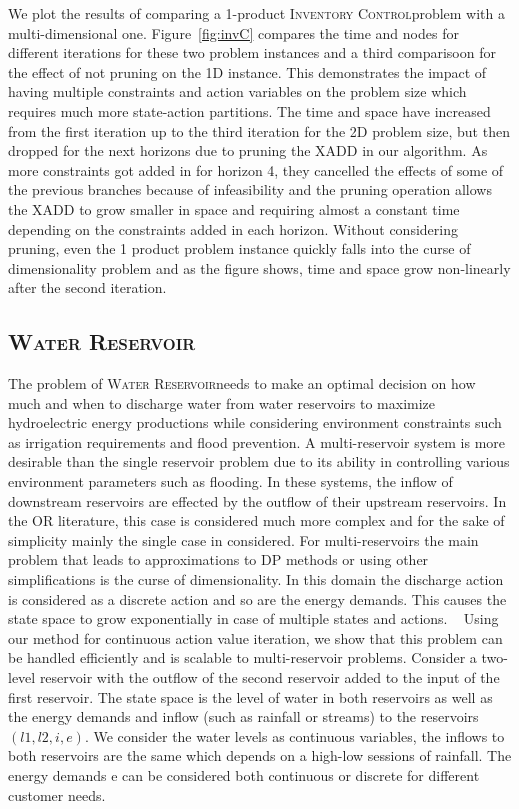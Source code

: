 \documentclass[letterpaper]{article}
\newcommand{\InventoryControl}{\textsc{Inventory Control}}
\newcommand{\WaterReservoir}{\textsc{Water Reservoir}}
\begin{document}
We plot the results of comparing a 1-product \InventoryControl problem with a multi-dimensional one. Figure~\ref{fig:invC} compares the time and nodes for different iterations for these two problem instances and a third comparisoon for the effect of not pruning on the 1D instance. This demonstrates the impact of having multiple constraints and action variables on the problem size which requires much more state-action partitions. The time and space have increased from the first iteration up to the third iteration for the 2D problem size, but then dropped for the next horizons due to pruning the XADD in our algorithm. As more constraints got added in for horizon 4, they cancelled the effects of some of the previous branches because of infeasibility and the pruning operation allows the XADD to grow smaller in space and requiring almost a constant time depending on the constraints added in each horizon. Without considering pruning, even the 1 product problem instance quickly falls into the curse of dimensionality problem and as the figure shows, time and space grow non-linearly after the second iteration. 



\subsection{\WaterReservoir}The problem of \WaterReservoir needs to make an optimal decision on how much and when to discharge water from water reservoirs to maximize hydroelectric energy productions while considering environment constraints such as irrigation requirements and flood prevention. 
A multi-reservoir system is more desirable than the single reservoir problem due to its ability in controlling various environment parameters such as flooding.  In these systems, the inflow of downstream reservoirs are effected by the outflow of their upstream reservoirs. In the OR literature, this case  is considered much more complex and for the sake of simplicity mainly the single case in considered. For multi-reservoirs the main problem that leads to approximations to DP methods or using other simplifications is the curse of dimensionality. In this domain the discharge action is considered as a discrete action  and so are the energy demands. This causes the state space to grow exponentially in case of multiple states and actions. ~\cite{reservoir}
Using our method for continuous action value iteration, we show that this problem can be handled efficiently and is scalable to multi-reservoir problems. Consider a two-level reservoir with the outflow of the second reservoir added to the input of the first reservoir. The state space is the level of water in both reservoirs as well as the energy demands and inflow (such as rainfall or streams) to the reservoirs $(l1,l2,i,e)$. We consider the water levels as continuous variables, the inflows to both reservoirs are the same which depends on a high-low sessions of rainfall. The energy demands e can be considered both continuous or discrete for different customer needs. 
\end{document}
